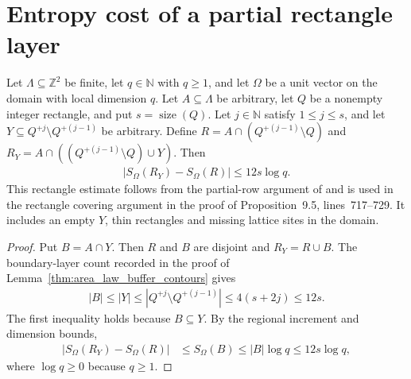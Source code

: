 \section{Entropy cost of a partial rectangle layer}

\begin{lemma}
    \label{thm:area_law_rectangle_partial_row}
    \leanok
    Let $\Lambda\subseteq\mathbb Z^2$ be finite, let $q\in\mathbb N$ with
    $q\ge1$, and let $\Omega$ be a unit vector on the domain with local
    dimension $q$. Let $A\subseteq\Lambda$ be arbitrary, let $Q$ be a
    nonempty integer rectangle, and put $s=\operatorname{size}(Q)$.
    Let $j\in\mathbb N$ satisfy $1\le j\le s$, and let
    $Y\subseteq Q^{+j}\setminus Q^{+(j-1)}$ be arbitrary. Define
    $R=A\cap(Q^{+(j-1)}\setminus Q)$ and
    $R_Y=A\cap((Q^{+(j-1)}\setminus Q)\cup Y)$.
    Then
    \begin{align}
        |S_\Omega(R_Y)-S_\Omega(R)|\le12s\log q.
    \end{align}
    This rectangle estimate follows from the partial-row argument of
    \cite[Lemma~9.4, lines~666--667]{OpenAI2026AreaLaw} and is used in the
    rectangle covering argument in the proof of Proposition~9.5,
    lines~717--729. It includes an empty $Y$, thin rectangles and missing
    lattice sites in the domain.
\end{lemma}
\begin{proof}
    \leanok
    Put $B=A\cap Y$. Then $R$ and $B$ are disjoint and $R_Y=R\cup B$.
    The boundary-layer count recorded in the proof of
    Lemma~\ref{thm:area_law_buffer_contours} gives
    \begin{align}
        |B|\le|Y|\le|Q^{+j}\setminus Q^{+(j-1)}|
        \le4(s+2j)\le12s.
    \end{align}
    The first inequality holds because $B\subseteq Y$. By the regional increment and dimension bounds,
    \begin{align}
        |S_\Omega(R_Y)-S_\Omega(R)|
         & \le S_\Omega(B)\le|B|\log q\le12s\log q,
    \end{align}
    where $\log q\ge0$ because $q\ge1$.
\end{proof}

